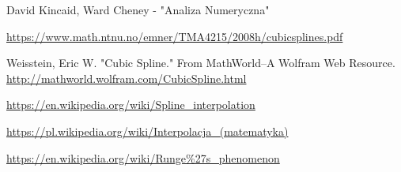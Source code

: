 \documentclass{article}
\begin{document}
\begin{thebibliography}{9}
	\itemsep2pt
			
	 David Kincaid, Ward Cheney - "Analiza Numeryczna"
	
	 \url{https://www.math.ntnu.no/emner/TMA4215/2008h/cubicsplines.pdf}
	
	 Weisstein, Eric W. "Cubic Spline." From MathWorld--A Wolfram Web Resource. \url{http://mathworld.wolfram.com/CubicSpline.html}
	
	 \url{https://en.wikipedia.org/wiki/Spline_interpolation}
	
	\url{https://pl.wikipedia.org/wiki/Interpolacja_(matematyka)}
	
	\url{https://en.wikipedia.org/wiki/Runge%27s_phenomenon}
	 
\end{thebibliography}
\end{document}
